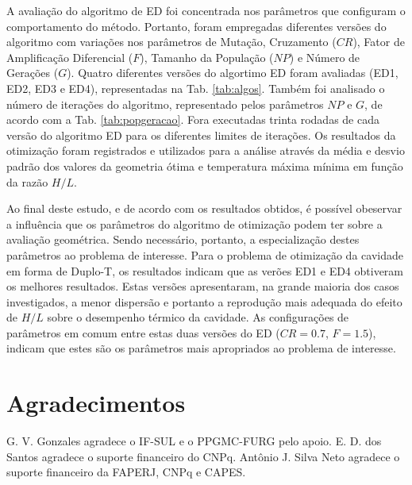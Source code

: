 \documentclass[12pt,A4,A4pt]{article}
\begin{document}
A avaliação do algoritmo de ED foi concentrada nos parâmetros que configuram o comportamento do método. Portanto, foram empregadas diferentes versões do algoritmo com variações nos parâmetros de Mutação, Cruzamento ($CR$), Fator de Amplificação Diferencial ($F$), Tamanho da População ($NP$) e Número de Gerações ($G$). Quatro diferentes versões do algortimo ED foram avaliadas (ED1, ED2, ED3 e ED4), representadas na Tab. \ref{tab:algos}. Também foi analisado o número de iterações do algoritmo, representado pelos parâmetros $NP$ e $G$, de acordo com a Tab. \ref{tab:popgeracao}. Fora executadas trinta rodadas de cada versão do algoritmo ED para os diferentes limites de iterações. Os resultados da otimização foram registrados e utilizados para a análise através da média e desvio padrão dos valores da geometria ótima e temperatura máxima mínima em função da razão $H/L$.

Ao final deste estudo, e de acordo com os resultados obtidos, é possível obeservar a influência que os parâmetros do algoritmo de otimização podem ter sobre a avaliação geométrica. Sendo necessário, portanto, a especialização destes parâmetros ao problema de interesse. Para o problema de otimização da cavidade em forma de Duplo-T, os resultados indicam que as verões ED1 e ED4 obtiveram os melhores resultados. Estas versões apresentaram, na grande maioria dos casos investigados, a menor dispersão e portanto a reprodução mais adequada do efeito de $H/L$ sobre o desempenho térmico da cavidade. As configurações de parâmetros em comum entre estas duas versões do ED ($CR=0.7$, $F=1.5$), indicam que estes são os parâmetros mais apropriados ao problema de interesse.

\section*{Agradecimentos}
\hspace{0.5cm}G. V. Gonzales agradece o IF-SUL e o  PPGMC-FURG pelo apoio. E. D. dos Santos agradece o suporte financeiro do CNPq. Antônio J. Silva Neto agradece o suporte financeiro da FAPERJ, CNPq e CAPES.



\end{document}
